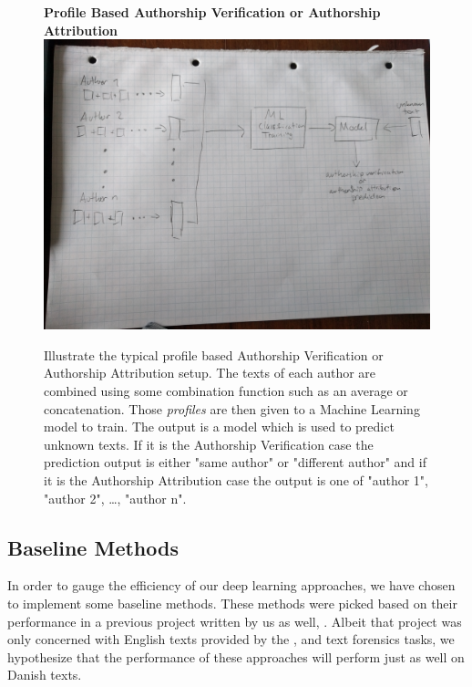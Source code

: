 \begin{figure}[htb]
    \centering
    \textbf{Profile Based Authorship Verification or Authorship Attribution}
    \includegraphics[width=\textwidth]{./graphs/method/profile_based.jpg}
    \caption{Illustrate the typical profile based Authorship Verification or
        Authorship Attribution setup. The texts of each author are combined
        using some combination function such as an average or concatenation.
        Those \textit{profiles} are then given to a Machine Learning model to
        train. The output is a model which is used to predict unknown texts.
        If it is the Authorship Verification case the prediction output is
        either "same author" or "different author" and if it is the Authorship
        Attribution case the output is one of "author 1", "author 2", \dots,
        "author n".}
\end{figure}


\subsection{Baseline Methods}

In order to gauge the efficiency of our deep learning approaches, we have
chosen to implement some baseline methods. These methods were picked
based on their performance in a previous project written by us as well,
\cite{US}. Albeit that project was only concerned with English texts
provided by the \cite{pan:2015}, and \cite{pan:2014} text forensics tasks,
we hypothesize that the performance of these approaches will perform just
as well on Danish texts.


